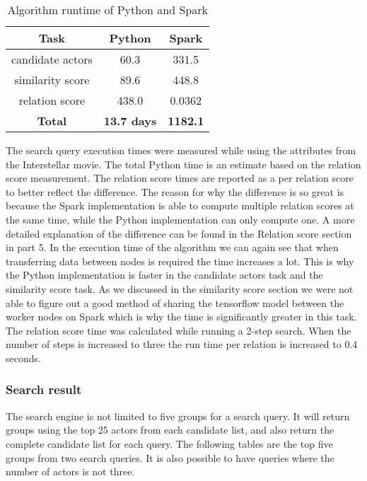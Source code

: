 \begin{table}
	\centering
    \begin{tabular}{ |c|c|c| } 
        \hline
        \textbf{Task} & \textbf{Python} & \textbf{Spark} \\ 
        \hline
        candidate actors & 60.3 & 331.5 \\ 
        similarity score & 89.6 & 448.8 \\ 
        relation score & 438.0 & 0.0362 \\ 
        \textbf{Total} & \textbf{13.7 days} & \textbf{1182.1} \\ 
        \hline
    \end{tabular}
	\caption{Algorithm runtime of Python and Spark}
	\label{tab:algorithm runtime}
\end{table}

The search query execution times were measured while using the attributes from the Interstellar movie. The total Python time is an estimate based on the relation score measurement. The relation score times are reported as a per relation score to better reflect the difference. The reason for why the difference is so great is because the Spark implementation is able to compute multiple relation scores at the same time, while the Python implementation can only compute one. A more detailed explanation of the difference can be found in the Relation score section in part 5. In the execution time of the algorithm we can again see that when transferring data between nodes is required the time increases a lot. This is why the Python implementation is faster in the candidate actors task and the similarity score task. As we discussed in the similarity score section we were not able to figure out a good method of sharing the tensorflow model between the worker nodes on Spark which is why the time is significantly greater in this task. The relation score time was calculated while running a 2-step search. When the number of steps is increased to three the run time per relation is increased to 0.4 seconds.

\subsubsection{Search result}

The search engine is not limited to five groups for a search query. It will return groups using the top 25 actors from each candidate list, and also return the complete candidate list for each query. The following tables are the top five groups from two search queries. It is also possible to have queries where the number of actors is not three. 


